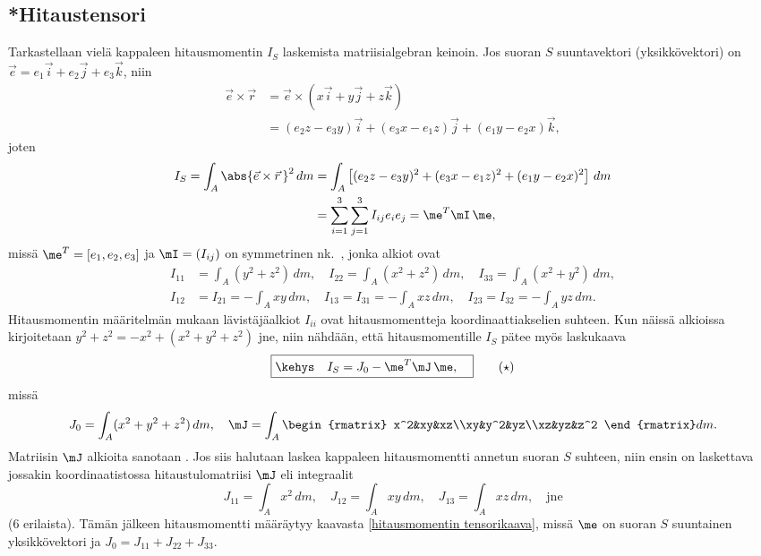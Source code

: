 \subsection*{*Hitaustensori}

Tarkastellaan vielä kappaleen hitausmomentin $I_S$ laskemista matriisialgebran keinoin. Jos
suoran $S$ suuntavektori (yksikkövektori) on $\vec e = e_1\vec i + e_2\vec j + e_3\vec k$, niin
\begin{align*}
\vec e\times\vec r &= \vec e \times(x\vec i + y\vec j + z\vec k) \\
                   &= (e_2 z - e_3 y)\vec i + (e_3 x - e_1 z)\vec j + (e_1 y - e_2 x)\vec k,
\end{align*}
joten
\begin{align*}
I_S = \int_A \abs{\vec e\times\vec r\,}^2\,dm 
   &= \int_A\left[(e_2 z - e_3 y)^2 + (e_3 x - e_1 z)^2 + (e_1 y - e_2 x)^2\right]\,dm \\
   &= \sum_{i=1}^3\sum_{j=1}^3 I_{ij}e_ie_j = \me^T\mI\,\me,
\end{align*}
missä $\me^T = [e_1,e_2,e_3]$ ja $\mI = (I_{ij})$ on symmetrinen nk.\ ,
jonka alkiot ovat
\begin{align*}
I_{11}&=\int_A (y^2+z^2)\,dm, \quad I_{22}=\int_A (x^2+z^2)\,dm, \quad 
                                    I_{33}=\int_A (x^2+y^2)\,dm, \\
I_{12}&=I_{21}=-\int_A xy\,dm, \quad I_{13}=I_{31}=-\int_A xz\,dm, \quad 
                                     I_{23}=I_{32}=-\int_A yz\,dm.
\end{align*}
Hitausmomentin määritelmän mukaan lävistäjäalkiot $I_{ii}$ ovat hitausmomentteja 
koordinaattiakselien suhteen. Kun näissä alkioissa kirjoitetaan 
$y^2+z^2=-x^2+(x^2+y^2+z^2)$ jne, niin nähdään, että hitausmomentille $I_S$ pätee myös
laskukaava
\begin{equation} \label{hitausmomentin tensorikaava}
\boxed{\kehys\quad I_S = J_0 - \me^T\mJ\,\me, \quad } \tag{$\star$}
\end{equation}
missä
\[ 
J_0 = \int_A (x^2+y^2+z^2)\,dm,\quad \mJ 
    = \int_A \begin{rmatrix} x^2&xy&xz\\xy&y^2&yz\\xz&yz&z^2 \end{rmatrix} dm. 
\]
Matriisin $\mJ$ alkioita sanotaan . Jos siis halutaan laskea kappaleen
hitausmomentti annetun suoran $S$ suhteen, niin ensin on laskettava jossakin koordinaatistossa
hitaustulomatriisi $\mJ$ eli integraalit 
\[ 
J_{11} = \int_A x^2\, dm, \quad J_{12} = \int_A xy\,dm, \quad 
                                J_{13}=\int_A xz\,dm, \quad \text{jne} 
\]
($6$ erilaista). Tämän jälkeen hitausmomentti määräytyy kaavasta
\eqref{hitausmomentin tensorikaava}, missä $\me$ on suoran $S$ suuntainen yksikkövektori
ja $J_0 = J_{11}+J_{22}+J_{33}$.

